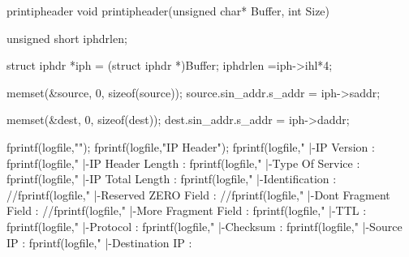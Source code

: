 \begin{chunk}{printipheader}
void printipheader(unsigned char* Buffer, int Size)
{
    unsigned short iphdrlen;
         
    struct iphdr *iph = (struct iphdr *)Buffer;
    iphdrlen =iph->ihl*4;
     
    memset(&source, 0, sizeof(source));
    source.sin_addr.s_addr = iph->saddr;
     
    memset(&dest, 0, sizeof(dest));
    dest.sin_addr.s_addr = iph->daddr;
     
    fprintf(logfile,"\n");
    fprintf(logfile,"IP Header\n");
    fprintf(logfile,"   |-IP Version        : %
    fprintf(logfile,"   |-IP Header Length  : %
    fprintf(logfile,"   |-Type Of Service   : %
    fprintf(logfile,"   |-IP Total Length   : %
    fprintf(logfile,"   |-Identification    : %
    //fprintf(logfile,"   |-Reserved ZERO Field   : %
    //fprintf(logfile,"   |-Dont Fragment Field   : %
    //fprintf(logfile,"   |-More Fragment Field   : %
    fprintf(logfile,"   |-TTL      : %
    fprintf(logfile,"   |-Protocol : %
    fprintf(logfile,"   |-Checksum : %
    fprintf(logfile,"   |-Source IP        : %
    fprintf(logfile,"   |-Destination IP   : %
}

\end{chunk}

